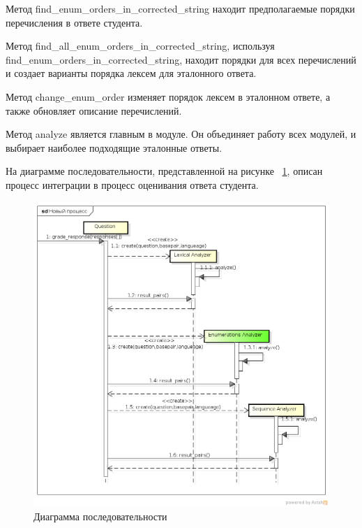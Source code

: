 \documentclass[a4paper,english,russian]{G2-105}
\begin{document}
\par Метод find\_enum\_orders\_in\_corrected\_string находит предполагаемые порядки перечисления в ответе студента.
\par Метод find\_all\_enum\_orders\_in\_corrected\_string, используя find\_enum\_orders\_in\_corrected\_string, находит порядки для всех перечислений и создает варианты порядка лексем для эталонного ответа.
\par Метод change\_enum\_order изменяет порядок лексем в эталонном ответе, а также обновляет описание перечислений.
\par Метод analyze является главным в модуле. Он объединяет работу всех модулей, и выбирает наиболее подходящие эталонные ответы.
\par На диаграмме последовательности, представленной на рисунке ~\ref{sequence}, описан процесс интеграции в процесс оценивания ответа студента.
\begin{figure}
    \center \includegraphics[width = \linewidth]{tzsequence.png}
    \caption{Диаграмма последовательности}
	\label{sequence}
\end{figure}
\end{document}

